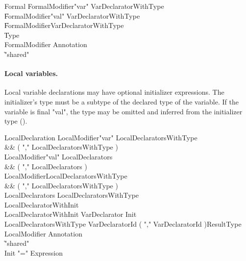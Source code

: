 \begin{grammar}
Formal
        \: FormalModifier\star \xcd"var" VarDeclaratorWithType \\
        \| FormalModifier\star \xcd"val" VarDeclaratorWithType \\
        \| FormalModifier\star VarDeclaratorWithType \\
        \| Type \\
FormalModifier \: Annotation \\
              \| \xcd"shared" \\
\end{grammar}

\paragraph{Local variables.}
Local variable declarations may have optional
initializer expressions.  The initializer's type must be a subtype of
the declared type of the variable.  If the variable is final \xcd"val",
the type may be omitted and
inferred from the initializer type ().

\begin{grammar}
LocalDeclaration
        \: LocalModifier\star \xcd"var" LocalDeclaratorsWithType \\&& ( \xcd"," LocalDeclaratorsWithType )\star \\
        \| LocalModifier\star \xcd"val" LocalDeclarators \\&& ( \xcd"," LocalDeclarators )\star \\
        \| LocalModifier\star LocalDeclaratorsWithType \\&& ( \xcd"," LocalDeclaratorsWithType )\star \\
LocalDeclarators
        \: LocalDeclaratorsWithType \\
        \: LocalDeclaratorWithInit \\
LocalDeclaratorWithInit
        \: VarDeclarator Init \\
LocalDeclaratorsWithType
        \: VarDeclaratorId
                ( \xcd"," VarDeclaratorId )\star ResultType \\
LocalModifier \: Annotation \\
              \| \xcd"shared" \\
Init \: \xcd"=" Expression \\
\end{grammar}

